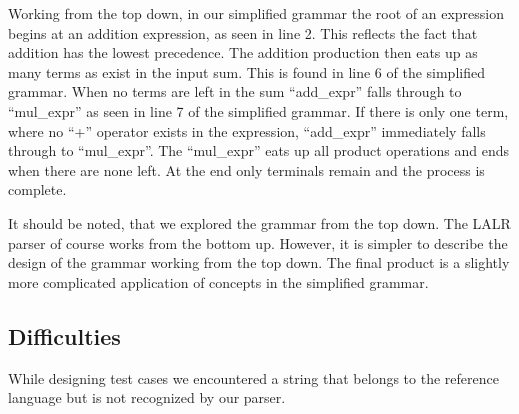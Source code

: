 \documentclass[oneside]{amsart}
\theoremstyle{definition}
\theoremstyle{remark}
\numberwithin{equation}{section}
\begin{document}
Working from the top down, in our simplified grammar the root of an expression begins at an addition
expression, as seen in line 2. This reflects the fact that addition has the lowest precedence. The
addition production then eats up as many terms as exist in the input sum. This is found in line 6 of
the simplified grammar. When no terms are left in the sum ``add\_expr'' falls through to ``mul\_expr''
as seen in line 7 of the simplified grammar. If there is only one term, where no ``+'' operator 
exists in the expression, ``add\_expr'' immediately falls through to ``mul\_expr''. The  ``mul\_expr''
eats up all product operations and ends when there are none left. At the end only terminals remain
and the process is complete.

It should be noted, that we explored the grammar from the top down. The LALR parser of course works
from the bottom up. However, it is simpler to describe the design of the grammar working from the
top down. The final product is a slightly more complicated application of concepts in the simplified
grammar.

\subsection{Difficulties}
While designing test cases we encountered a string that belongs to the reference language but is
not recognized by our parser.

\end{document}
